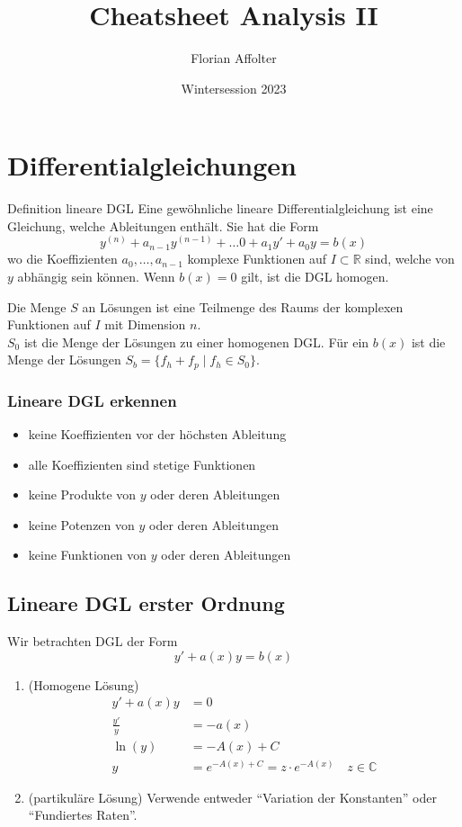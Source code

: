 \documentclass[a4paper,10pt]{article}
\title{Cheatsheet Analysis II}
\author{Florian Affolter}
\date{Wintersession 2023}
\def\R{\mathbb{R}}
\def\C{\mathbb{C}}
\begin{document}
\maketitle



\section{Differentialgleichungen}
\begin{mainbox}{Definition lineare DGL}
  Eine gewöhnliche lineare Differentialgleichung ist eine Gleichung, welche Ableitungen enthält. Sie hat die Form \[y^{(n)} + a_{n-1} y^{(n-1)} + \ldots0 + a_1 y' + a_0y = b(x)\]
  wo die Koeffizienten \(a_0, \ldots, a_{n-1}\) komplexe Funktionen auf \(I \subset \R\) sind, welche von \(y\) abhängig sein können. Wenn \(b(x) = 0\) gilt, ist die DGL homogen.
\end{mainbox}
Die Menge \(S\) an Lösungen ist eine Teilmenge des Raums der komplexen Funktionen auf \(I\) mit Dimension \(n\). \\
\(S_0\) ist die Menge der Lösungen zu einer homogenen DGL. Für ein \(b(x)\) ist die Menge der Lösungen \(S_b = \{f_h + f_p \mid f_h \in S_0\}\).
\subsubsection*{Lineare DGL erkennen}
\begin{itemize}
  \item keine Koeffizienten vor der höchsten Ableitung
  \item alle Koeffizienten sind stetige Funktionen
  \item keine Produkte von $y$ oder deren Ableitungen
  \item keine Potenzen von $y$ oder deren Ableitungen
  \item keine Funktionen von $y$ oder deren Ableitungen
\end{itemize}

\subsection{Lineare DGL erster Ordnung}
Wir betrachten DGL der Form \[y' + a(x)y = b(x)\]
\begin{enumerate}
  \item (Homogene Lösung) 
  \begin{align*}
    y' + a(x)y &= 0\\
    \frac{y'}{y} &= -a(x)\\
    \ln(y) &= -A(x)+C\\
    y &= e^{-A(x)+C} = z \cdot e^{-A(x)}\quad z \in \C
  \end{align*}
  \item (partikuläre Lösung) Verwende entweder ``Variation der Konstanten'' oder ``Fundiertes Raten''.
\end{enumerate}
\end{document}
